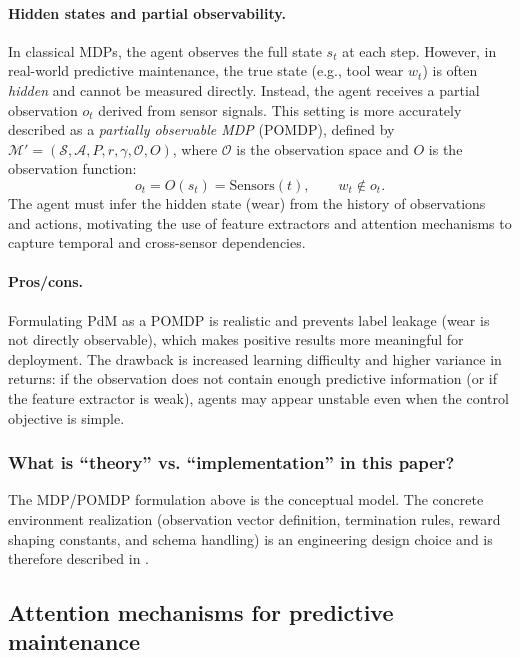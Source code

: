 \documentclass[11pt]{article}
\begin{document}
\paragraph{Hidden states and partial observability.}
In classical MDPs, the agent observes the full state $s_t$ at each step. However, in real-world predictive maintenance, the true state (e.g., tool wear $w_t$) is often \emph{hidden} and cannot be measured directly. Instead, the agent receives a partial observation $o_t$ derived from sensor signals. This setting is more accurately described as a \emph{partially observable MDP} (POMDP), defined by $\mathcal{M}'=(\mathcal{S},\mathcal{A},P,r,\gamma,\mathcal{O},O)$, where $\mathcal{O}$ is the observation space and $O$ is the observation function:
\begin{equation}
  o_t = O(s_t) = \mathrm{Sensors}(t), \qquad w_t \notin o_t.
\end{equation}
The agent must infer the hidden state (wear) from the history of observations and actions, motivating the use of feature extractors and attention mechanisms to capture temporal and cross-sensor dependencies.

\paragraph{Pros/cons.}
Formulating PdM as a POMDP is realistic and prevents label leakage (wear is not directly observable), which makes positive results more meaningful for deployment. The drawback is increased learning difficulty and higher variance in returns: if the observation does not contain enough predictive information (or if the feature extractor is weak), agents may appear unstable even when the control objective is simple.

\subsubsection{What is ``theory'' vs. ``implementation'' in this paper?}
The MDP/POMDP formulation above is the conceptual model. The concrete environment realization (observation vector definition, termination rules, reward shaping constants, and schema handling) is an engineering design choice and is therefore described in .

\subsection{Attention mechanisms for predictive maintenance}
\end{document}
